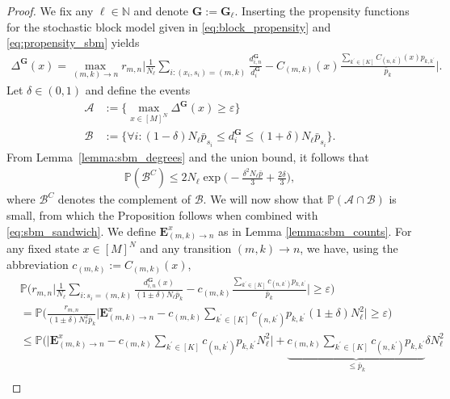 \documentclass[a4paper,
               10pt,
               pdftex,
               normalheadings,
               headsepline,
               footsepline,
               headinclude,
               footinclude,
               DIV=14,
               abstracton]
{scrartcl}
\newcommand{\rv}[1]{\bm{#1}}
\begin{document}
\begin{proof}
    We fix any $\ell \in \mathbb{N}$ and denote $\rv{G} := \rv{G}_{\ell}$.
    Inserting the propensity functions for the stochastic block model given in \eqref{eq:block_propensity} and \eqref{eq:propensity_sbm}  yields
    \begin{align}
        \Delta^{\rv{G}}(x) = \max_{(m,k)\to n} r_{m,n} \Big\lvert \frac{1}{N_\ell} \sum_{i: (x_i, s_i) = (m,k)} \frac{d_{i,n}^{\rv{G}}}{d_i^{\rv{G}}} - C_{(m,k)}(x) \frac{\sum_{{k^\prime}\in [K]} C_{(n,{k^\prime})}(x) p_{k,{k^\prime}}}{\bar{p}_k} \Big\lvert.
    \end{align}
    Let $\delta \in (0,1)$ and define the events
    \begin{align}
        \mathcal{A} &:= \Big\{ \max_{x\in [M]^{N}} \Delta^{\rv{G}}(x) \geq \varepsilon \Big\} \\
        \mathcal{B} &:= \Big\{ \forall i: (1-\delta) N_\ell \bar{p}_{s_i} \leq d^{\rv{G}}_i \leq (1+\delta)N_\ell \bar{p}_{s_i}\Big\}.
    \end{align}
    From Lemma~\ref{lemma:sbm_degrees} and the union bound, it follows that
    \begin{align} \label{eq:sbm_sandwich}
        \mathbb{P}(\mathcal{B}^C) \leq 2 N_\ell \exp\Big(-\frac{\delta^2 N_\ell \bar{p}}{3} + \frac{2 \delta}{3}\Big),
    \end{align}
    where $\mathcal{B}^C$ denotes the complement of $\mathcal{B}$.
    We will now show that $\mathbb{P}(\mathcal{A} \cap \mathcal{B})$ is small, from which the Proposition follows when combined with \eqref{eq:sbm_sandwich}.
    We define $\rv{E}^x_{(m,k)\to n}$ as in Lemma \ref{lemma:sbm_counts}.
    For any fixed state $x \in [M]^N$ and any transition $(m,k) \to n$, we have, using the abbreviation $c_{(m,k)} := C_{(m,k)}(x)$,
    \begin{align}
        &\mathbb{P}\Big( r_{m,n} \Big\lvert \frac{1}{N_\ell} \sum_{i : s_{i} = (m,k)} \frac{d^{\rv{G}}_{i,n}(x)}{(1\pm \delta)N_\ell \bar{p}_k} - c_{(m,k)} \frac{\sum_{{k^\prime} \in [K]} c_{(n,k^\prime)} p_{k,{k^\prime}}}{\bar{p}_k}  \Big\rvert \geq \varepsilon \Big)\\
        &= \mathbb{P}\Big( \frac{r_{m,n}}{(1\pm \delta) N_\ell^2 \bar{p}_k}  \big\lvert \rv{E}^x_{(m,k)\to n} - c_{(m,k)} \sum_{{k^\prime} \in [K]} c_{(n,k^\prime)} p_{k,{k^\prime}} (1\pm \delta) N_\ell^2 \big\rvert \geq \varepsilon \Big)\\
        & \leq \mathbb{P}\Big( \big\lvert \rv{E}^x_{(m,k)\to n} - c_{(m,k)} \sum_{{k^\prime} \in [K]} c_{(n,k^\prime)} p_{k,{k^\prime}} N_\ell^2 \big\rvert + \underbrace{c_{(m,k)} \sum_{{k^\prime} \in [K]} c_{(n,k^\prime)} p_{k,{k^\prime}}}_{\leq \bar{p}_k} \delta N_\ell^2\\

\end{align}
\end{proof}
\end{document}
